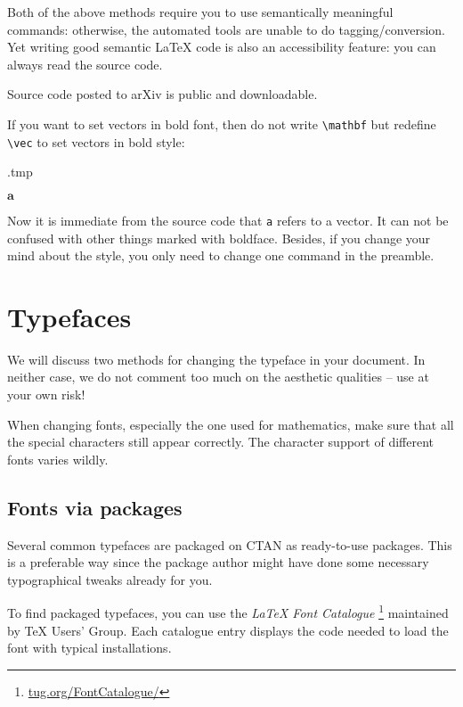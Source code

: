 Both of the above methods require you to use semantically meaningful commands:
otherwise, the automated tools are unable to do tagging/conversion.
Yet writing good semantic \LaTeX{} code is also an accessibility feature:
you can always read the source code.

\begin{remark}
Source code posted to arXiv is public and downloadable.
\end{remark}

If you want to set vectors in bold font, then do not write \verb|\mathbf| but
redefine \verb|\vec| to set vectors in bold style:
%
\begin{VerbatimOut}{\jobname.tmp}
\renewcommand{\vec}{\mathbf}

$\vec a$
\end{VerbatimOut}
\ShowExample
%
Now it is immediate from the source code that \verb|a| refers to a vector.
It can not be confused with other things marked with boldface.
Besides, if you change your mind about the style,
you only need to change one command in the preamble.


%
%
%
\section{Typefaces}\label{sec:typefaces}

We will discuss two methods for changing the typeface in your document.
In neither case, we do not comment too much on the aesthetic qualities
-- use at your own risk!

\begin{warning}
When changing fonts, especially the one used for mathematics,
make sure that all the special characters still appear correctly.
The character support of different fonts varies wildly.
\end{warning}


%
%
\subsection{Fonts via packages}

Several common typefaces are packaged on CTAN as ready-to-use packages.
This is a preferable way since the package author might have done some necessary
typographical tweaks already for you.

To find packaged typefaces, you can use the \emph{\LaTeX{} Font Catalogue}%
\footnote{\url{tug.org/FontCatalogue/}}
maintained by \TeX{} Users' Group.
Each catalogue entry displays the code needed to load the font with typical installations.

